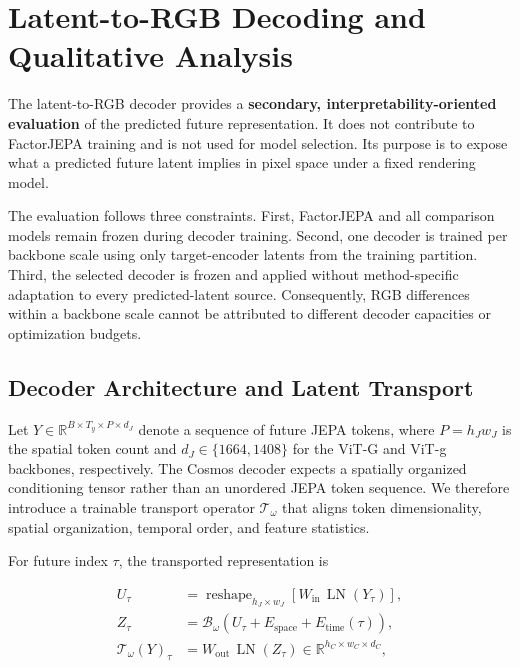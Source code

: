 \section{Latent-to-RGB Decoding and Qualitative Analysis}
\label{app:rgb_decoder}

The latent-to-RGB decoder provides a \textbf{secondary,
interpretability-oriented evaluation} of the predicted future
representation. It does not contribute to FactorJEPA training and is
not used for model selection. Its purpose is to expose what a predicted
future latent implies in pixel space under a fixed rendering model.

The evaluation follows three constraints. First, FactorJEPA and all
comparison models remain frozen during decoder training. Second, one
decoder is trained per backbone scale using only target-encoder latents
from the training partition. Third, the selected decoder is frozen and
applied without method-specific adaptation to every predicted-latent
source. Consequently, RGB differences within a backbone scale cannot
be attributed to different decoder capacities or optimization budgets.


\subsection{Decoder Architecture and Latent Transport}
\label{app:rgb_architecture}

Let
\(
Y\in\mathbb{R}^{B\times T_y\times P\times d_J}
\)
denote a sequence of future JEPA tokens, where \(P=h_Jw_J\) is the
spatial token count and \(d_J\in\{1664,1408\}\) for the ViT-G and
ViT-g backbones, respectively. The Cosmos decoder expects a spatially
organized conditioning tensor rather than an unordered JEPA token
sequence. We therefore introduce a trainable transport operator
\(\mathcal T_\omega\) that aligns token dimensionality, spatial
organization, temporal order, and feature statistics.

For future index \(\tau\), the transported representation is

\begin{equation*}
\begin{aligned}
U_\tau
&=
\operatorname{reshape}_{h_J\times w_J}
\left[
W_{\mathrm{in}}\,
\operatorname{LN}(Y_\tau)
\right],                                                     \\
Z_\tau
&=
\mathcal B_\omega
\left(
U_\tau
+
E_{\mathrm{space}}
+
E_{\mathrm{time}}(\tau)
\right),                                                     \\
\mathcal T_\omega(Y)_\tau
&=
W_{\mathrm{out}}\,
\operatorname{LN}(Z_\tau)
\in
\mathbb{R}^{h_C\times w_C\times d_C},
\end{aligned}
\end{equation*}

